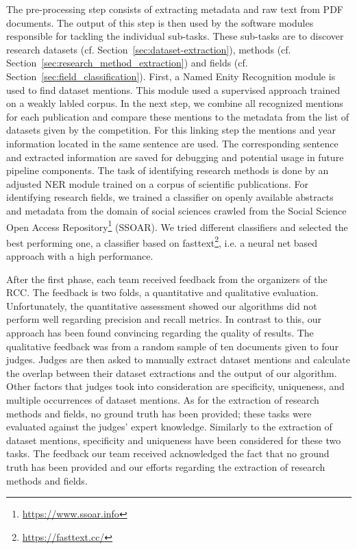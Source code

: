 The pre-processing step consists of extracting metadata and raw text from PDF documents.
The output of this step is then used by the software modules responsible for tackling the individual sub-tasks.
These sub-tasks are to discover research datasets (cf. Section~\ref{sec:dataset-extraction}), methods (cf. Section~\ref{sec:research_method_extraction}) and fields (cf. Section~\ref{sec:field_classification}).
First, a Named Enity Recognition module is used to find dataset mentions.
This module used a supervised approach trained on a weakly labled corpus.
In the next step, we combine all recognized mentions for each publication and compare these mentions to the metadata from the list of datasets given by the competition. %
For this linking step the mentions and year information located in the same sentence are used.
The corresponding sentence and extracted information are saved for debugging and potential usage in future pipeline components.
The task of identifying research methods is done by an adjusted NER module trained on a corpus of scientific publications. 
For identifying research fields, we trained a classifier on openly available abstracts and metadata from the domain of social sciences crawled from the Social Science Open Access Repository\footnote{\url{https://www.ssoar.info}} (SSOAR).
We tried different classifiers and selected the best performing one, a classifier based on fasttext\footnote{\url{https://fasttext.cc/}}, i.e. a neural net based approach with a high performance\cite{joulin2017bag}.



After the first phase, each team received feedback from the organizers of the RCC.
The feedback is two folds, a quantitative and qualitative evaluation. Unfortunately, the quantitative assessment showed our algorithms did not perform well regarding precision and recall metrics. In contrast to this, our approach has been found convincing regarding the quality of results. The qualitative feedback was from a random sample of ten documents given to four judges.
Judges are then asked to manually extract dataset mentions and calculate the overlap between their dataset extractions and the output of our algorithm.
Other factors that judges took into consideration are specificity, uniqueness, and multiple occurrences of dataset mentions.
As for the extraction of research methods and fields, no ground truth has been provided; these tasks were evaluated against the judges' expert knowledge.
Similarly to the extraction of dataset mentions, specificity and uniqueness have been considered for these two tasks.
The feedback our team received acknowledged the fact that no ground truth has been provided and our efforts regarding the extraction of research methods and fields.

